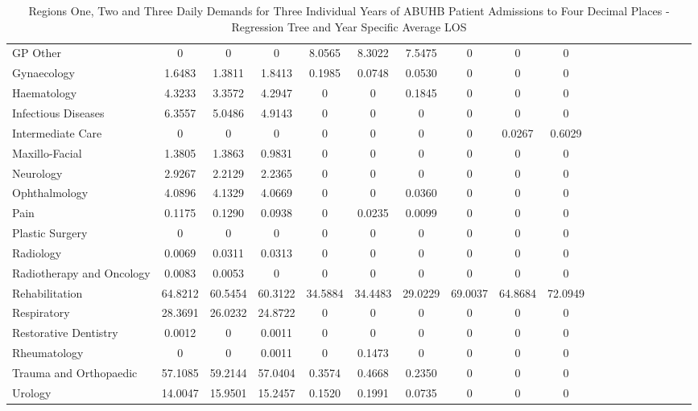 \documentclass[thesis.tex]{subfiles}
\begin{document}
\begin{landscape}
\begin{table}[h!]
{\begin{tabular}{lcccccccccccccccccc}
GP Other&	0&	0&	0&	8.0565&	8.3022&	7.5475&	0&0&	0\\
Gynaecology	&1.6483&	1.3811	&1.8413	&0.1985&	0.0748&	0.0530&	0&	0&	0\\
Haematology&	4.3233	&3.3572	&4.2947	&0&	0	&0.1845&	0&	0&	0\\
Infectious Diseases&	6.3557	&5.0486&	4.9143	&0&	0&	0&	0&	0&	0\\
Intermediate Care	&0&	0&	0&	0&	0&	0&	0&	0.0267&	0.6029\\
Maxillo-Facial&	1.3805	&1.3863	&0.9831	&0&	0&	0&	0&	0&	0\\
Neurology&	2.9267	&2.2129&	2.2365&	0&	0&	0&	0&	0&	0\\
Ophthalmology	&4.0896	&4.1329	&4.0669&	0&	0&	0.0360&	0&	0&	0\\
Pain	&0.1175&	0.1290&	0.0938&	0&	0.0235&	0.0099&	0&0&	0\\
Plastic Surgery	&0&	0&	0&	0&	0&	0&	0&	0&	0\\
Radiology&	0.0069&	0.0311&	0.0313	&0&	0&	0&	0&	0&	0\\
Radiotherapy and Oncology	&0.0083&	0.0053&	0&	0&	0&	0&	0&	0&	0\\
Rehabilitation	&64.8212	&60.5454&	60.3122	&34.5884&	34.4483&	29.0229&	69.0037&	64.8684&	72.0949\\
Respiratory&	28.3691&	26.0232	&24.8722&	0&	0&	0&	0&	0&	0\\
Restorative Dentistry&	0.0012&	0&	0.0011&	0&	0&	0&	0&	0&	0\\
Rheumatology	&0&0&	0.0011	&0&	0.1473&	0&	0&0	&	0\\
Trauma and Orthopaedic&	57.1085&	59.2144&	57.0404	&0.3574&	0.4668&	0.2350&	0&	0&	0\\
Urology&	14.0047	&15.9501	&15.2457&	0.1520&	0.1991&	0.0735	&0&	0&	0\\
\bottomrule
\end{tabular}  } 
\caption{Regions One, Two and Three Daily Demands for Three Individual Years of ABUHB Patient Admissions to Four Decimal Places - Regression Tree and Year Specific Average LOS}
    \label{apptab:LinkedDemands3a}
\end{table}

\begin{table}[h!]
    \centering{}
\end{table}
\end{landscape}
\end{document}
